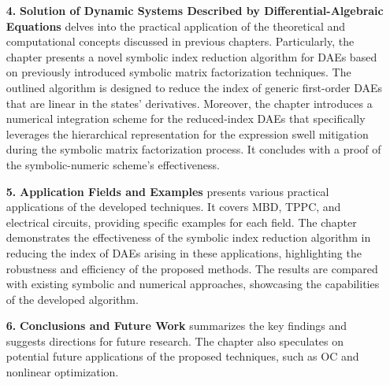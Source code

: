 \begin{enumerate}
  \item[\textbf{4.}] \textbf{Solution of Dynamic Systems Described by Differential-Algebraic Equations} delves into the practical application of the theoretical and computational concepts discussed in previous chapters. Particularly, the chapter presents a novel symbolic index reduction algorithm for \acp{DAE} based on previously introduced symbolic matrix factorization techniques. The outlined algorithm is designed to reduce the index of generic first-order \acp{DAE} that are linear in the states' derivatives. Moreover, the chapter introduces a numerical integration scheme for the reduced-index \acp{DAE} that specifically leverages the hierarchical representation for the expression swell mitigation during the symbolic matrix factorization process. It concludes with a proof of the symbolic-numeric scheme's effectiveness.
  \item[\textbf{5.}] \textbf{Application Fields and Examples} presents various practical applications of the developed techniques. It covers \ac{MBD}, \ac{TPPC}, and electrical circuits, providing specific examples for each field. The chapter demonstrates the effectiveness of the symbolic index reduction algorithm in reducing the index of \acp{DAE} arising in these applications, highlighting the robustness and efficiency of the proposed methods. The results are compared with existing symbolic and numerical approaches, showcasing the capabilities of the developed algorithm.
  \item[\textbf{6.}] \textbf{Conclusions and Future Work} summarizes the key findings and suggests directions for future research. The chapter also speculates on potential future applications of the proposed techniques, such as \ac{OC} and nonlinear optimization.
\end{enumerate}

